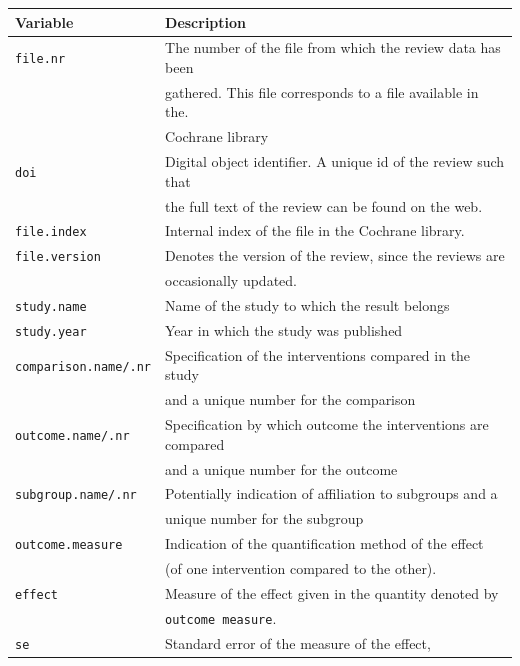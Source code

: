 \documentclass[11pt,a4paper,twoside]{book}\usepackage[]{graphicx}\usepackage[]{color}
\begin{document}
\begin{table}[ht]
  \begin{center}
    \begin{tabular}{l l}
      \textbf{Variable} & \textbf{Description}\\
      \hline
      \texttt{file.nr} & The number of the file from which the review data has been \\&gathered. This file corresponds to a file available in the. \\& Cochrane library\\
      \texttt{doi} & Digital object identifier. A unique id of the review such that  \\ &the full text of the review can be found on the web.\\
      \texttt{file.index} & Internal index of the file in the Cochrane library.\\
      \texttt{file.version} & Denotes the version of the review, since the reviews are \\ &occasionally updated.\\
      \hline
      \texttt{study.name} & Name of the study to which the result belongs\\
      \texttt{study.year} & Year in which the study was published\\
      \hline
      \texttt{comparison.name/.nr} & Specification of the interventions compared in the study  \\ &and a unique number for the comparison\\
      \texttt{outcome.name/.nr} & Specification by which outcome the interventions are compared\\ &and a unique number for the outcome\\
      \texttt{subgroup.name/.nr} & Potentially indication of affiliation to subgroups and a \\ &unique number for the subgroup\\
      \texttt{outcome.measure} & Indication of the quantification method of the effect \\ &(of one intervention compared to the other).\\
      \texttt{effect} & Measure of the effect given in the quantity denoted by \\ &\texttt{outcome measure}.\\
      \texttt{se} & Standard error of the measure of the effect,\\

\end{tabular}
\end{center}
\end{table}
\end{document}

